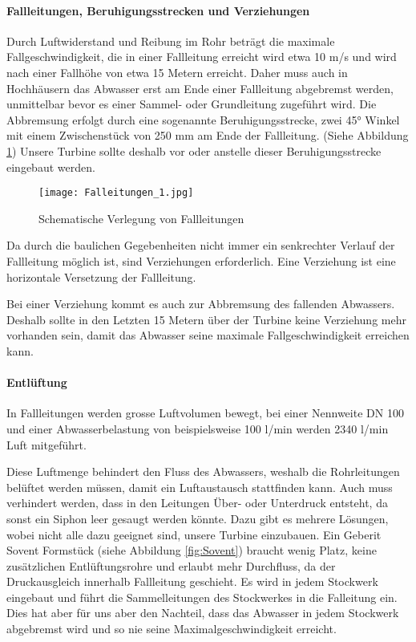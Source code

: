 \paragraph{Fallleitungen, Beruhigungsstrecken und Verziehungen}
Durch Luftwiderstand und Reibung im Rohr beträgt die maximale Fallgeschwindigkeit, die in einer Fallleitung erreicht wird etwa 10 m/s und wird nach einer Fallhöhe von etwa 15 Metern erreicht. Daher muss auch in Hochhäusern das Abwasser erst am Ende einer Fallleitung abgebremst werden, unmittelbar bevor es einer Sammel- oder Grundleitung zugeführt wird. Die Abbremsung erfolgt durch eine sogenannte Beruhigungsstrecke, zwei 45° Winkel mit einem Zwischenstück von 250 mm am Ende der Fallleitung. (Siehe Abbildung \ref{fig:Falleitungen}) Unsere Turbine sollte deshalb vor oder anstelle dieser Beruhigungsstrecke eingebaut werden.
\cite{baunetzwissen}

\begin{figure}[H]
	\centering
	\texttt{[image: Falleitungen\_1.jpg]}
	\caption{Schematische Verlegung von Fallleitungen \cite{baunetzwissen}}
	\label{fig:Falleitungen}
	
\end{figure}

Da durch die baulichen Gegebenheiten nicht immer ein senkrechter Verlauf der Fallleitung möglich ist, sind Verziehungen erforderlich. Eine Verziehung ist eine horizontale Versetzung der Fallleitung. \cite{docplayer}

Bei einer Verziehung kommt es auch zur Abbremsung des fallenden Abwassers. Deshalb sollte in den Letzten 15 Metern über der Turbine keine Verziehung mehr vorhanden sein, damit das Abwasser seine maximale Fallgeschwindigkeit erreichen kann.

\paragraph{Entlüftung}
In Fallleitungen werden grosse Luftvolumen bewegt, bei einer Nennweite DN 100 und einer Abwasserbelastung von beispielsweise 100 l/min werden 2340 l/min Luft mitgeführt.
\cite{docplayer}

Diese Luftmenge behindert den Fluss des Abwassers, weshalb die Rohrleitungen belüftet werden müssen, damit ein Luftaustausch stattfinden kann. Auch muss verhindert werden, dass in den Leitungen Über- oder Unterdruck entsteht, da sonst ein Siphon leer gesaugt werden könnte. Dazu gibt es mehrere Lösungen, wobei nicht alle dazu geeignet sind, unsere Turbine einzubauen. Ein Geberit Sovent Formstück (siehe Abbildung \ref{fig:Sovent}) braucht wenig Platz, keine zusätzlichen Entlüftungsrohre und erlaubt mehr Durchfluss, da der Druckausgleich innerhalb Fallleitung geschieht. Es wird in jedem Stockwerk eingebaut und führt die Sammelleitungen des Stockwerkes in die Falleitung ein. Dies hat aber für uns aber den Nachteil, dass das Abwasser in jedem Stockwerk abgebremst wird und so nie seine Maximalgeschwindigkeit erreicht.

